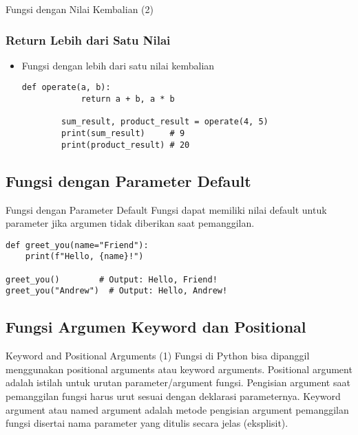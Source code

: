 \documentclass[aspectratio=169, table]{beamer}
\begin{document}
\begin{frame}[fragile]{Fungsi dengan Nilai Kembalian (2)}
\subsubsection{Return Lebih dari Satu Nilai}
\begin{itemize}
    \item Fungsi dengan lebih dari satu nilai kembalian
        \begin{lstlisting}[style=PythonStyle, caption={Kode Python: function_with_multiple_return.py}]
        def operate(a, b):
            return a + b, a * b

        sum_result, product_result = operate(4, 5)
        print(sum_result)     # 9
        print(product_result) # 20
        \end{lstlisting}
\end{itemize}
\end{frame}

\subsection{Fungsi dengan Parameter Default}
\begin{frame}[fragile]{Fungsi dengan Parameter Default}
Fungsi dapat memiliki nilai default untuk parameter jika argumen tidak diberikan saat pemanggilan.

\begin{lstlisting}[style=PythonStyle, caption={Kode Python: function_with_default_parameter.py}]
def greet_you(name="Friend"):
    print(f"Hello, {name}!")

greet_you()        # Output: Hello, Friend!
greet_you("Andrew")  # Output: Hello, Andrew!
\end{lstlisting}
\end{frame}

\subsection{Fungsi Argumen Keyword dan Positional}
\begin{frame}[fragile]{Keyword and Positional Arguments (1)}
Fungsi di Python bisa dipanggil menggunakan positional arguments atau keyword arguments. Positional argument adalah istilah untuk urutan parameter/argument fungsi. Pengisian argument saat pemanggilan fungsi harus urut sesuai dengan deklarasi parameternya. Keyword argument atau named argument adalah metode pengisian argument pemanggilan fungsi disertai nama parameter yang ditulis secara jelas (eksplisit).
\end{frame}
\end{document}

